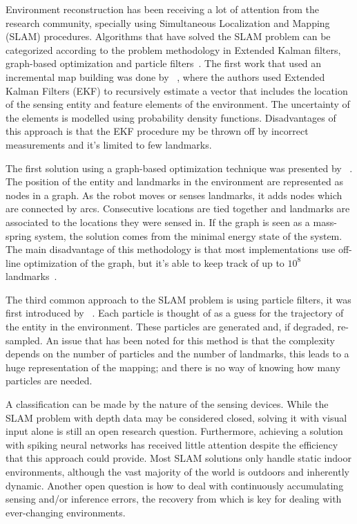 Environment reconstruction has been receiving a lot of attention from the research  community, specially using Simultaneous Localization and Mapping (SLAM) procedures. 
Algorithms that have solved the SLAM problem can be categorized according to the problem methodology in Extended Kalman filters, graph-based optimization and particle filters~\cite{Thrun2008_SLAM}.
The first work that used an incremental map building was done by \citeauthor{smith1990estimating}~\cite{smith1990estimating}, where the authors used Extended Kalman Filters (EKF) to recursively estimate a vector that includes the location of the sensing entity and feature elements of the environment. The uncertainty of the elements is modelled using probability density functions. Disadvantages of this approach is that the EKF procedure my be thrown off by incorrect measurements and it's limited to few landmarks.

The first solution using a graph-based optimization technique was presented by \citeauthor{lu1997globally}~\cite{lu1997globally}. The position of the entity and landmarks in the environment are represented as nodes in a graph. As the robot moves or senses landmarks, it adds nodes which are connected by arcs. Consecutive locations are tied together and landmarks are associated to the locations they were sensed in. If the graph is seen as a mass-spring system, the solution comes from the minimal energy state of the system. The main disadvantage of this methodology is that most implementations use off-line optimization of the graph, but it's able to keep track of up to $10^8$ landmarks~\cite{Thrun2008_SLAM}. 

The third common approach to the SLAM problem is using particle filters, it was first introduced by \citeauthor{montemerlo2002fastslam}~\cite{montemerlo2002fastslam}. Each particle is thought of as a guess for the trajectory of the entity in the environment. These particles are generated and, if degraded, re-sampled. An issue that has been noted for this method is that the complexity depends on the number of particles and the number of landmarks, this leads to a huge representation of the mapping; and there is no way of knowing how many particles are needed. 

A classification can be made by the nature of the sensing devices. While the SLAM problem with depth data may be considered closed, solving it with visual input alone is still an open research question. Furthermore, achieving a solution with spiking neural networks has received little attention despite the efficiency that this approach could provide. Most SLAM solutions only handle static indoor environments, although the vast majority of the world is outdoors and inherently dynamic. Another open question is how to deal with continuously accumulating sensing and/or inference errors, the recovery from which is key for dealing with ever-changing environments. 

